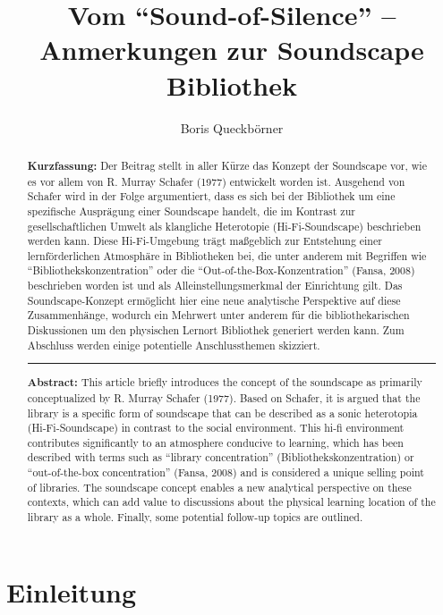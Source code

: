 \documentclass[a4paper,
fontsize=11pt,
oneside,
numbers=noperiodatend,
parskip=half-,
bibliography=totoc,
final
]{scrartcl}
\title{\LARGE{Vom \enquote{Sound-of-Silence} -- Anmerkungen zur Soundscape Bibliothek}}%
\author{Boris Queckbörner} %
\date{}
\begin{document}
\maketitle
\thispagestyle{fancyplain} 

\begin{abstract}
\noindent
\textbf{Kurzfassung:} Der Beitrag stellt in aller Kürze das Konzept der
Soundscape vor, wie es vor allem von R. Murray Schafer (1977) entwickelt
worden ist. Ausgehend von Schafer wird in der Folge argumentiert, dass
es sich bei der Bibliothek um eine spezifische Ausprägung einer
Soundscape handelt, die im Kontrast zur gesellschaftlichen Umwelt als
klangliche Heterotopie (Hi-Fi-Soundscape) beschrieben werden kann. Diese
Hi-Fi-Umgebung trägt maßgeblich zur Entstehung einer lernförderlichen
Atmosphäre in Bibliotheken bei, die unter anderem mit Begriffen wie
\enquote{Bibliothekskonzentration} oder die \enquote{Out-of-the-Box-Konzentration}
(Fansa, 2008) beschrieben worden ist und als Alleinstellungsmerkmal der
Einrichtung gilt. Das Soundscape-Konzept ermöglicht hier eine neue
analytische Perspektive auf diese Zusammenhänge, wodurch ein Mehrwert
unter anderem für die bibliothekarischen Diskussionen um den physischen
Lernort Bibliothek generiert werden kann. Zum Abschluss werden einige
potentielle Anschlussthemen skizziert.

\begin{center}\rule{0.5\linewidth}{0.5pt}\end{center}

\noindent
\textbf{Abstract:} This article briefly introduces the concept of the
soundscape as primarily conceptualized by R. Murray Schafer (1977).
Based on Schafer, it is argued that the library is a specific form of
soundscape that can be described as a sonic heterotopia
(Hi-Fi-Soundscape) in contrast to the social environment. This hi-fi
environment contributes significantly to an atmosphere conducive to
learning, which has been described with terms such as \enquote{library
concentration} (Bibliothekskonzentration) or \enquote{out-of-the-box
concentration} (Fansa, 2008) and is considered a unique selling point
of libraries. The soundscape concept enables a new analytical
perspective on these contexts, which can add value to discussions about
the physical learning location of the library as a whole. Finally, some
potential follow-up topics are outlined.
\end{abstract}



\hypertarget{einleitung}{%
\section{Einleitung}\label{einleitung}}
\end{document}
